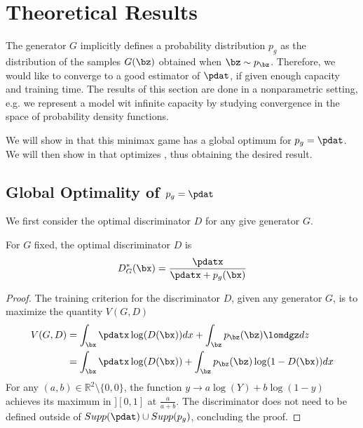 \section{Theoretical Results}

The generator $G$ implicitly defines a probability distribution $p_g$ as the distribution of the samples $G(\bz)$ obtained when $\bz\sim p_{\bz}$. Therefore, we would like %
to converge to a good estimator of  $\pdat$, if given enough capacity and training time. The results of this section are done in a nonparametric setting, e.g. we represent a model wit infinite capacity by studying convergence in the space of probability density functions.

\noindent We will show in %
that this minimax game has a global optimum for $p_g = \pdat$. We will then show in %
that %
optimizes %
, thus obtaining the desired result.

\subsection{Global Optimality of $p_g = \pdat$}

We first consider the optimal discriminator $D$ for any give generator $G$.

\begin{proposition}
	For $G$ fixed, the optimal discriminator $D$ is
	\begin{equation}
		D^{\ast}_G(\bx) = \frac{\pdatx}{\pdatx + p_g(\bx)}
	\end{equation}
\end{proposition}

\begin{proof}
	The training criterion for the discriminator $D$, given any generator $G$, is to maximize the quantity $V(G, D)$
	\begin{align*}
		V(G, D) &= \int_{\bx}{\pdatx}\log(D(\bx))dx + \int_{\bz}{p_{\bz}(\bz)\lomdgz}dz\\
		&= \int_{\bx}{\pdatx}\log(D(\bx)) + \int_{\bz}{p_{\bz}(\bz)\log(1 - D(\bx))}dx %
	\end{align*}
	For any $(a, b) \in \mathbb{R}^2 \setminus \{0,0\}$, the function $y\rightarrow a\log(Y)+ b\log(1-y)$ achieves its maximum in $][0,1]$ at $\frac{a}{a+b}$. The discriminator does not need to be defined outside of $Supp(\pdat)\cup Supp(p_g)$, concluding the proof.
\end{proof}

